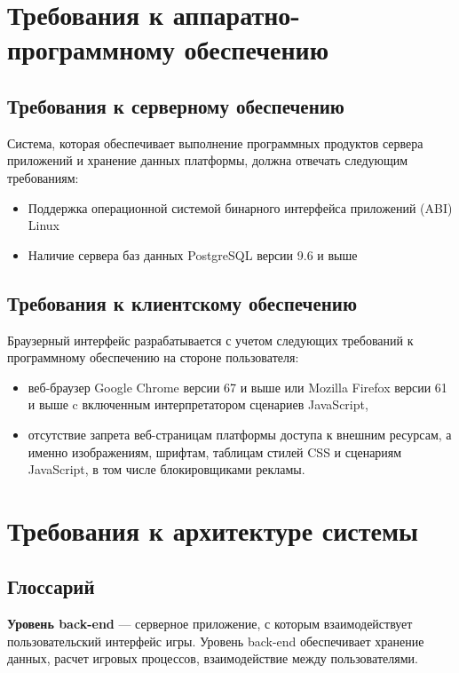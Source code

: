 \documentclass[12pt, a4paper]{article}
\begin{document}
\section{Требования к аппаратно-программному обеспечению}

\subsection{Требования к серверному обеспечению}

Система, которая обеспечивает выполнение программных продуктов сервера приложений
и хранение данных платформы, должна отвечать следующим требованиям:

\begin{itemize}
\item Поддержка операционной системой бинарного интерфейса приложений (ABI) Linux
\item Наличие сервера баз данных PostgreSQL версии 9.6 и выше
\end{itemize}

\subsection{Требования к клиентскому обеспечению}

Браузерный интерфейс разрабатывается с учетом следующих требований к
программному обеспечению на стороне пользователя:

\begin{itemize}
\item веб-браузер Google Chrome версии 67 и выше или
Mozilla Firefox версии 61 и выше c включенным интерпретатором сценариев JavaScript,
\item отсутствие запрета веб-страницам платформы доступа к внешним ресурсам,
а именно изображениям, шрифтам, таблицам стилей CSS и сценариям JavaScript,
в том числе блокировщиками рекламы.
\end{itemize}

\section{Требования к архитектуре системы}

\subsection{Глоссарий}

\textbf{Уровень back-end} — серверное приложение, с которым взаимодействует
пользовательский интерфейс игры. Уровень back-end обеспечивает хранение данных,
расчет игровых процессов, взаимодействие между пользователями.
\end{document}
